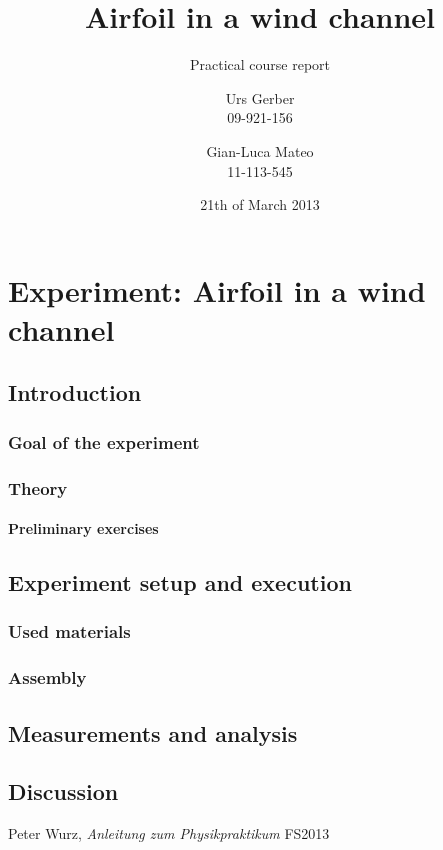 \documentclass{scrreprt}
\author{Urs Gerber\\09-921-156 \and Gian-Luca Mateo\\11-113-545}
\date{21th of March 2013}
\title{Airfoil in a wind channel}
\subtitle{Practical course report}
\begin{document}
\maketitle

\tableofcontents
\newpage

\chapter{Experiment: Airfoil in a wind channel}
\section{Introduction}
\subsection{Goal of the experiment}
\subsection{Theory}
\subsubsection{Preliminary exercises}
\section{Experiment setup and execution}

\subsection{Used materials}


\subsection{Assembly}

\section{Measurements and analysis}
\section{Discussion}

\begin{thebibliography}{9}

  Peter Wurz,
  \emph{Anleitung zum Physikpraktikum}
  FS2013

\end{thebibliography}
\end{document}
